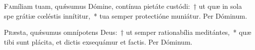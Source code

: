 \documentclass[vesperale_romanum.tex]{subfiles}
\begin{document}
\label{dom_5_pe}
{}


\oratio

\lettrine{F}{a}míliam tuam, quǽsumus Dómine, contínua pietáte custódi:~† ut quæ in sola spe grátiæ cœléstis innítitur,~* tua semper prote\-ctióne muniátur.
Per Dóminum.

\label{dom_6_pe}
{}


\oratio

\lettrine{P}{r}æsta, quǽsumus omnípotens Deus:~† ut semper rationabília meditántes,~* quæ tibi sunt plácita, et dictis exsequámur et factis. Per Dóminum.

\biggerrule
\end{document}
